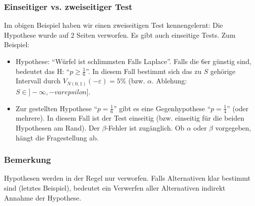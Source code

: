 \subsubsection{Einseitiger vs. zweiseitiger Test}
Im obigen Beispiel haben wir einen zweiseitigen Test kennengelernt: Die Hypothese wurde auf 2 Seiten verworfen. Es gibt auch einseitige Tests. Zum Beispiel:
\begin{itemize}
\item Hypothese: ``W\"urfel ist schlimmsten Falls Laplace''. Falls die 6er g\"unstig sind, bedeutet das H: ``$p\geq\frac{1}{6}$''. In diesem Fall bestimmt sich das zu $S$ geh\"orige Intervall durch $V_{N(0,1)}(-\varepsilon)=5\%$ (bzw. $\alpha$. Ablehung: $S\in]-\infty,-varepsilon]$.
\item Zur gestellten Hypothese ``$p=\frac{1}{6}$'' gibt es eine Gegenhypothese ``$p=\frac{1}{4}$'' (oder mehrere). In diesem Fall ist der Test einseitig (bzw. einseitig f\"ur die beiden Hypothesen am Rand). Der $\beta$-Fehler ist zug\"anglich. Ob $\alpha$ oder $\beta$ vorgegeben, h\"angt die Fragestellung ab.
\end{itemize}
\subsubsection{Bemerkung}
Hypothesen werden in der Regel nur verworfen. Falls  Alternativen klar bestimmt sind (letztes Beispiel), bedeutet ein Verwerfen aller Alternativen indirekt Annahme der Hypothese.
